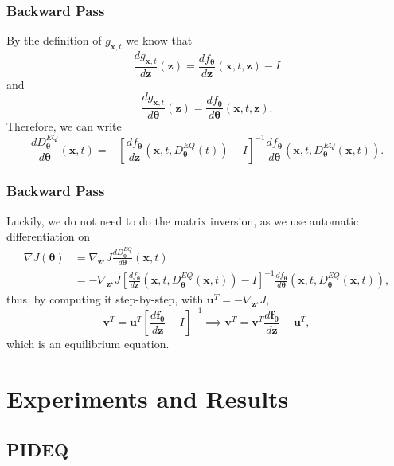 \documentclass[t]{beamer}
\begin{document}
\begin{frame}
    \frametitle{Backward Pass}
    
    By the definition of $g_{\bm{x},t}$ we know that \[
	\frac{d g_{\bm{x},t}}{d \bm{z}}(\bm{z}) = \frac{d f_{\bm{\theta}}}{d \bm{z}}(\bm{x},t,\bm{z}) - I 
    \] and \[
    \frac{d g_{\bm{x},t}}{d \bm{\theta}}(\bm{z}) = \frac{d f_{\bm{\theta}}}{d \bm{\theta}}(\bm{x},t,\bm{z})
    .\] Therefore, we can write \[
    \frac{d D^{EQ}_{\bm{\theta}}}{d \bm{\theta}}(\bm{x},t) = - \left[ \frac{d f_{\bm{\theta}}}{d \bm{z}}(\bm{x},t,D^{EQ}_{\bm{\theta}}(t)) - I \right]^{-1} \frac{d f_{\bm{\theta}}}{d \bm{\theta}}(\bm{x},t,D^{EQ}_{\bm{\theta}}(\bm{x},t))
    .\] 
\end{frame}

\begin{frame}
    \frametitle{Backward Pass}

    Luckily, we do not need to do the matrix inversion, as we use automatic differentiation on
    \begin{align*}
	\nabla J\left( \bm{\theta} \right) &= \nabla_{\bm{z}^{\star}} J \frac{d D^{EQ}_{\bm{\theta}}}{d \bm{\theta}}(\bm{x},t) \\
	&= - \nabla_{\bm{z}^{\star}} J \left[ \frac{d f_{\bm{\theta}}}{d \bm{z}}(\bm{x},t,D^{EQ}_{\bm{\theta}}(\bm{x},t)) - I \right]^{-1} \frac{d f_{\bm{\theta}}}{d \bm{\theta}}(\bm{x},t,D^{EQ}_{\bm{\theta}}(\bm{x},t)),
    \end{align*}
    thus, by computing it step-by-step, with $\bm{u}^T=- \nabla_{\bm{z}^{\star}} J$, \[
	\bm{v}^T = \bm{u}^T\left[ \frac{d \bm{f}_{\bm{\theta}}}{d \bm{z}} - I \right]^{-1} \implies \bm{v}^T = \bm{v}^T \frac{d \bm{f}_{\bm{\theta}}}{d \bm{z}} - \bm{u}^T
    ,\] which is an equilibrium equation.
\end{frame}

\section{Experiments and Results}

\subsection{PIDEQ}
\end{document}
